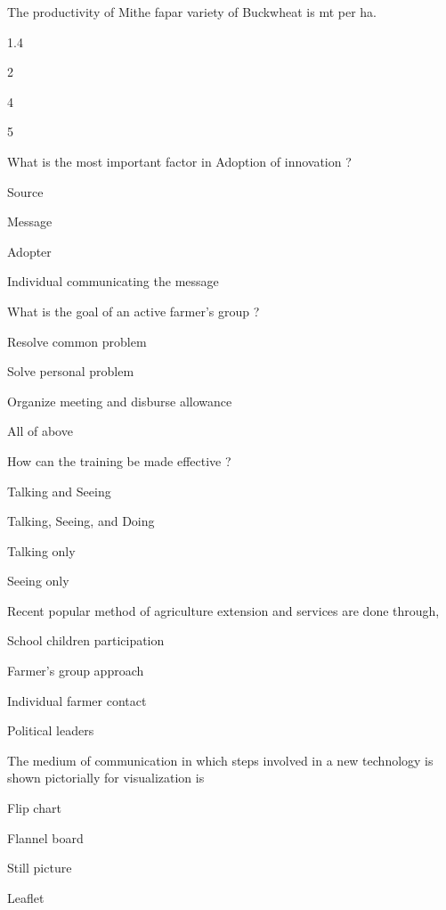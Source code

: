 \begin{questions}
\question The productivity of Mithe fapar variety of Buckwheat is \fillin[][3cm] mt per ha.
\begin{items}
\item* 1.4
\item 2
\item 4
\item 5
\end{items}

\question What is the most important factor in Adoption of innovation ?
\begin{items}
\item Source
\item Message
\item* Adopter
\item Individual communicating the message
\end{items}

\question What is the goal of an active farmer's group ?
\begin{items}
\item* Resolve common problem
\item Solve personal problem
\item Organize meeting and disburse allowance
\item All of above
\end{items}

\question How can the training be made effective ?
\begin{items}
\item Talking and Seeing
\item* Talking, Seeing, and Doing
\item Talking only
\item Seeing only
\end{items}

\question Recent popular method of agriculture extension and services are done through,
\begin{items}
\item School children participation
\item* Farmer's group approach
\item Individual farmer contact
\item Political leaders
\end{items}

\question The medium of communication in which steps involved in a new technology is shown pictorially for visualization is
\begin{items}
\item* Flip chart
\item Flannel board
\item Still picture
\item Leaflet
\end{items}


\end{questions}
